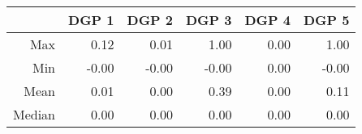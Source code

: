 \begin{table}[ht]
\centering
\begin{tabular}{rrrrrr}
  \hline
 & DGP 1 & DGP 2 & DGP 3 & DGP 4 & DGP 5 \\ 
  \hline
Max & 0.12 & 0.01 & 1.00 & 0.00 & 1.00 \\ 
  Min & -0.00 & -0.00 & -0.00 & 0.00 & -0.00 \\ 
  Mean & 0.01 & 0.00 & 0.39 & 0.00 & 0.11 \\ 
  Median & 0.00 & 0.00 & 0.00 & 0.00 & 0.00 \\ 
   \hline
\end{tabular}
\end{table}
